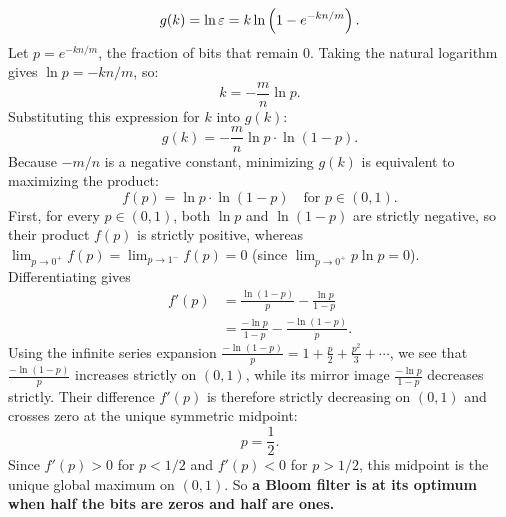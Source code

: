 \[
  g(k) = \ln \varepsilon = k \ln\left(1 - e^{-kn/m}\right).
\]
Let $p = e^{-kn/m}$, the fraction of bits that remain $0$. Taking the natural logarithm gives $\ln p = -kn/m$, so:
\[
  k = -\frac{m}{n} \ln p.
\]
Substituting this expression for $k$ into $g(k)$:
\[
  g(k) = -\frac{m}{n} \ln p \cdot \ln(1 - p).
\]
Because $-m/n$ is a negative constant, minimizing $g(k)$ is equivalent to maximizing the product:
\[
  f(p) = \ln p \cdot \ln(1 - p) \quad \text{for } p \in (0, 1).
\]
First, for every $p \in (0,1)$, both $\ln p$ and $\ln(1-p)$ are strictly negative, so their product $f(p)$ is strictly positive, whereas $\lim_{p \to 0^+} f(p) = \lim_{p \to 1^-} f(p) = 0$ (since $\lim_{p \to 0^+} p \ln p = 0$). Differentiating gives
\begin{align*}
  f'(p) &= \frac{\ln(1-p)}{p} - \frac{\ln p}{1-p} \\
        &= \frac{-\ln p}{1-p} - \frac{-\ln(1-p)}{p}.
\end{align*}
Using the infinite series expansion $\frac{-\ln(1-p)}{p} = 1 + \frac{p}{2} + \frac{p^2}{3} + \cdots$, we see that $\frac{-\ln(1-p)}{p}$ increases strictly on $(0,1)$, while its mirror image $\frac{-\ln p}{1-p}$ decreases strictly. Their difference $f'(p)$ is therefore strictly decreasing on $(0,1)$ and crosses zero at the unique symmetric midpoint:
\[
  p = \frac{1}{2}.
\]
Since $f'(p) > 0$ for $p < 1/2$ and $f'(p) < 0$ for $p > 1/2$, this midpoint is the unique global maximum on $(0,1)$. So \textbf{a Bloom filter is at its optimum when half the bits are zeros and half are ones.}

